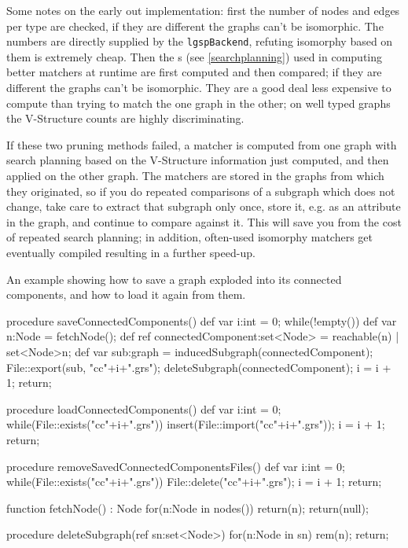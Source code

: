 Some notes on the early out implementation: first the number of nodes and edges per type are checked, if they are different the graphs can't be isomorphic. The numbers are directly supplied by the \texttt{lgspBackend}, refuting isomorphy based on them is extremely cheap.
Then the s (see \ref{searchplanning}) used in computing better matchers at runtime are first computed and then compared; if they are different the graphs can't be isomorphic. They are a good deal less expensive to compute than trying to match the one graph in the other; on well typed graphs the V-Structure counts are highly discriminating.

If these two pruning methods failed, a matcher is computed from one graph with search planning based on the V-Structure information just computed, and then applied on the other graph.
The matchers are stored in the graphs from which they originated, so if you do repeated comparisons of a subgraph which does not change, take care to extract that subgraph only once, store it, e.g. as an attribute in the graph, and continue to compare against it. 
This will save you from the cost of repeated search planning; in addition, often-used isomorphy matchers get eventually compiled resulting in a further speed-up.


\begin{example}
An example showing how to save a graph exploded into its connected components, and how to load it again from them.
\begin{grgen}
procedure saveConnectedComponents()
{
	def var i:int = 0;
	while(!empty()) {
		def var n:Node = fetchNode();
		def ref connectedComponent:set<Node> = reachable(n) | set<Node>{n};
		def var sub:graph = inducedSubgraph(connectedComponent);
		File::export(sub, "cc"+i+".grs");
		deleteSubgraph(connectedComponent);
		i = i + 1;
	}
	return;
}

procedure loadConnectedComponents()
{
	def var i:int = 0;
	while(File::exists("cc"+i+".grs")) {
		insert(File::import("cc"+i+".grs"));
		i = i + 1;
	}
	return;
}

procedure removeSavedConnectedComponentsFiles()
{
	def var i:int = 0;
	while(File::exists("cc"+i+".grs")) {
		File::delete("cc"+i+".grs");
		i = i + 1;
	}
	return;
}

function fetchNode() : Node
{
	for(n:Node in nodes()) {
		return(n);
	}
	return(null);
}

procedure deleteSubgraph(ref sn:set<Node>)
{
	for(n:Node in sn) {
		rem(n);
	}
	return;
}
\end{grgen}
\end{example}

